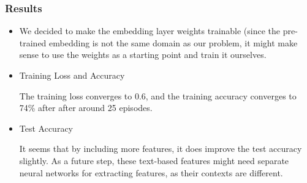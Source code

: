 \documentclass[english]{article}
\begin{document}
\subsubsection{Results}
\begin{itemize}
    \item We decided to make the embedding layer weights trainable (since the pre-trained embedding is not the same domain as our problem, it might make sense to use the weights as a starting point and train it ourselves.
    \item Training Loss and Accuracy
    
    
    
    The training loss converges to 0.6, and the training accuracy converges to 74\% after after around 25 episodes.
    
    \item Test Accuracy
    
    It seems that by including more features, it does improve the test accuracy slightly. As a future step, these text-based features might need separate neural networks for extracting features, as their contexts are different.


\end{itemize}
\end{document}
